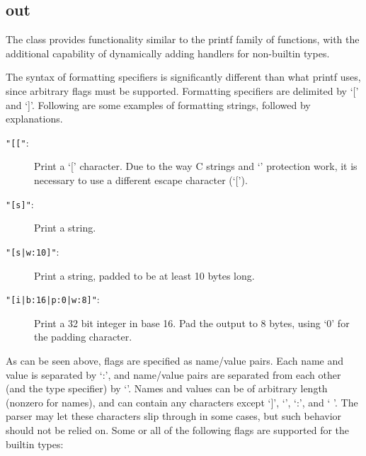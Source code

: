 %
%
%
%
%              

\subsection{out}
\label{out}

The  class provides functionality similar to the printf
family of functions, with the additional capability of dynamically adding
handlers for non-builtin types.

The syntax of formatting specifiers is significantly different than what
printf uses, since arbitrary flags must be supported.  Formatting
specifiers are delimited by `[' and `]'.  Following are some examples of
formatting strings, followed by explanations.

\begin{description}
\item[{\tt "[["}: ]
	Print a `[' character.  Due to the way C strings and `{\bs}' protection
 	work, it is necessary to use a different escape character (`[').
\item[{\tt "[s]"}: ]
	Print a string.
\item[{\tt "[s|w:10]"}: ]
	Print a string, padded to be at least 10 bytes long.
\item[{\tt "[i|b:16|p:0|w:8]"}: ]
	Print a 32 bit integer in base 16.  Pad the output to 8 bytes, using `0'
	for the padding character.
\end{description}

As can be seen above, flags are specified as name/value pairs.  Each name
and value is separated by `:', and name/value pairs are separated from each
other (and the type specifier) by `{\pipe}'.  Names and values can be of
arbitrary length (nonzero for names), and can contain any characters except
`]', `{\pipe}', `:', and ` '.  The parser may let these characters slip
through in some cases, but such behavior should not be relied on.  Some or
all of the following flags are supported for the builtin types:

